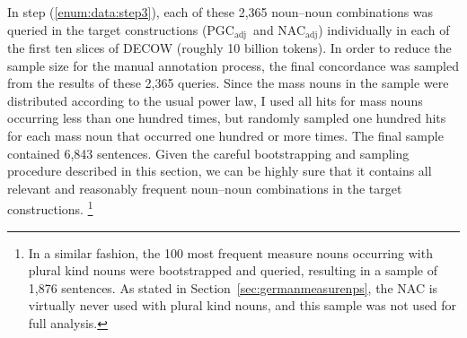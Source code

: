 \documentclass[USenglish]{article}
\newcommand{\Sub}[1]{\ensuremath{\mathrm{_{#1}}}}
\newcommand{\NACa}{NAC\Sub{adj}}
\newcommand{\PGCa}{PGC\Sub{adj}}
\begin{document}
In step (\ref{enum:data:step3}), each of these 2,365 noun–noun combinations was queried in the target constructions (\PGCa\ and \NACa) individually in each of the first ten slices of DECOW (roughly 10 billion tokens).
%
In order to reduce the sample size for the manual annotation process, the final concordance was sampled from the results of these 2,365 queries.
Since the mass nouns in the sample were distributed according to the usual power law, I used all hits for mass nouns occurring less than one hundred times, but randomly sampled one hundred hits for each mass noun that occurred one hundred or more times.
The final sample contained 6,843 sentences.
Given the careful bootstrapping and sampling procedure described in this section, we can be highly sure that it contains all relevant and reasonably frequent noun–noun combinations in the target constructions.%
\footnote{In a similar fashion, the 100 most frequent measure nouns occurring with plural kind nouns were bootstrapped and queried, resulting in a sample of 1,876 sentences.
As stated in Section~\ref{sec:germanmeasurenps}, the NAC is virtually never used with plural kind nouns, and this sample was not used for full analysis.
}
\end{document}
